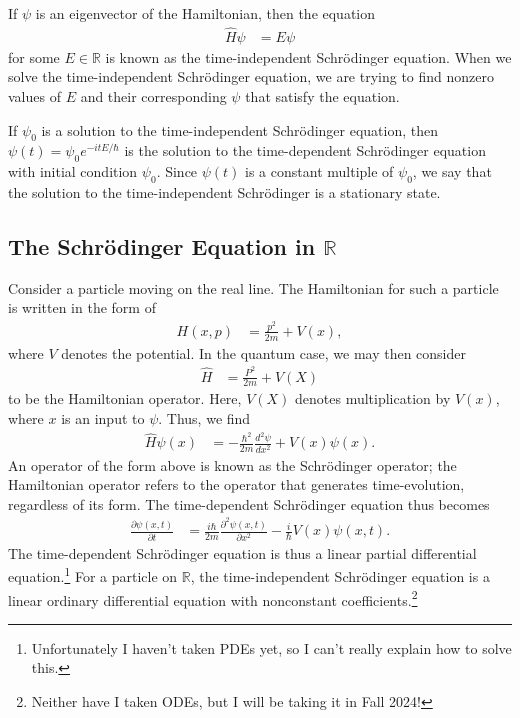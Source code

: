 \documentclass[12pt]{extarticle}
\newcommand{\R}{\mathbb{R}}
\theoremstyle{plain}
\theoremstyle{definition}
\theoremstyle{remark}
\renewcommand{\newline}{\hfill\break}
\begin{document}
  If $\psi$ is an eigenvector of the Hamiltonian, then the equation
  \begin{align*}
    \hat{H}\psi &= E\psi
  \end{align*}
  for some $E\in \R$ is known as the time-independent Schrödinger equation. When we solve the time-independent Schrödinger equation, we are trying to find nonzero values of $E$ and their corresponding $\psi$ that satisfy the equation.\newline

  If $\psi_0$ is a solution to the time-independent Schrödinger equation, then $\displaystyle \psi(t) = \psi_0 e^{-itE/\hbar}$ is the solution to the time-dependent Schrödinger equation with initial condition $\psi_0$. Since $\psi(t)$ is a constant multiple of $\psi_0$, we say that the solution to the time-independent Schrödinger is a stationary state.
  \subsection{The Schrödinger Equation in $\R$}%
  Consider a particle moving on the real line. The Hamiltonian for such a particle is written in the form of
  \begin{align*}
    H(x,p) &= \frac{p^2}{2m} + V(x),
  \end{align*}
  where $V$ denotes the potential. In the quantum case, we may then consider
  \begin{align*}
    \hat{H} &= \frac{P^2}{2m} + V(X)
  \end{align*}
  to be the Hamiltonian operator. Here, $V(X)$ denotes multiplication by $V(x)$, where $x$ is an input to $\psi$. Thus, we find
  \begin{align*}
    \hat{H}\psi(x) &= -\frac{\hbar^2}{2m}\frac{d^2\psi}{dx^2} + V(x)\psi(x).
  \end{align*}
  An operator of the form above is known as the Schrödinger operator; the Hamiltonian operator refers to the operator that generates time-evolution, regardless of its form. The time-dependent Schrödinger equation thus becomes
  \begin{align*}
    \frac{\partial \psi(x,t)}{\partial t} &= \frac{i\hbar}{2m}\frac{\partial^2\psi(x,t)}{\partial x^2} - \frac{i}{\hbar}V(x)\psi(x,t).
  \end{align*}
  The time-dependent Schrödinger equation is thus a linear partial differential equation.\footnote{Unfortunately I haven't taken PDEs yet, so I can't really explain how to solve this.} For a particle on $\R$, the time-independent Schrödinger equation is a linear ordinary differential equation with nonconstant coefficients.\footnote{Neither have I taken ODEs, but I will be taking it in Fall 2024!}
\end{document}
